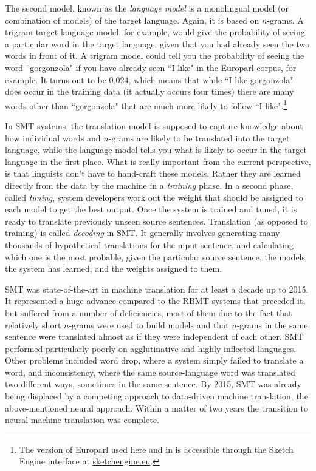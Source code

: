 \documentclass[output=paper]{langscibook}
\begin{document}
The second model, known as the \textit{language model} is a monolingual model (or combination of models) of the target language. Again, it is based on $n$-grams. A trigram target language model, for example, would give the probability of seeing a particular word in the target language, given that you had already seen the two words in front of it. A trigram model could tell you the probability of seeing the word  “gorgonzola" if you have already seen  “I like" in the Europarl corpus, for example. It turns out to be 0.024, which means that while “I like gorgonzola" does occur in the training data (it actually occurs four times) there are many words other than “gorgonzola" that are much more likely to follow “I like".\footnote{The version of Europarl used here and in  is accessible through the Sketch Engine interface at \url{sketchengine.eu}.}   

In SMT systems, the translation model is supposed to capture knowledge about how individual words and $n$-grams are likely to be translated into the target language, while the language model tells you what is likely to occur in the target language in the first place. What is really important from the current perspective, is that linguists don't have to hand-craft these models. Rather they are learned directly from the data by the machine in a \textit{training} phase. In a second phase, called \textit{tuning}, system developers work out the weight that should be assigned to each model to get the best output. Once the system is trained and tuned, it is ready to translate previously unseen source sentences. Translation (as opposed to training) is called \textit{decoding} in SMT. It generally involves generating many thousands of hypothetical translations for the input sentence, and calculating which one is the most probable, given the particular source sentence, the models the system has learned, and the weights assigned to them.

SMT was state-of-the-art in machine translation for at least a decade up to 2015. It represented a huge advance compared to the RBMT systems that preceded it, but suffered from a number of deficiencies, most of them due to the fact that relatively short $n$-grams were used to build models and that  $n$-grams in the same sentence were translated almost as if they were independent of each other. SMT performed particularly poorly on agglutinative and highly inflected languages. Other problems included word drop, where a system simply failed to translate a word, and inconsistency, where the same source-language word was translated two different ways, sometimes in the same sentence. By 2015, SMT was already being  displaced by a competing approach to data-driven machine translation, the above-mentioned neural approach. Within a matter of two years the transition to neural machine translation was complete.
\end{document}
